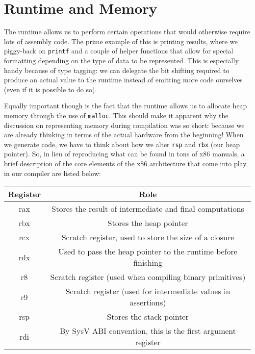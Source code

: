 \section{Runtime and Memory}
The runtime allows us to perform certain operations that would otherwise require lots of assembly code.
The prime example of this is printing results, where we piggy-back on \texttt{printf} and a couple of
helper functions that allow for special formatting depending on the type of data to be represented. This
is especially handy because of type tagging: we can delegate the bit shifting required to produce an
actual value to the runtime instead of emitting more code ourselves (even if it is possible to do so).

Equally important though is the fact that  the runtime allows us to allocate heap memory through the use of
\texttt{malloc}.
This should make it apparent why the discussion on representing memory during compilation was
so short: because we are already thinking in terms of the actual hardware from the beginning! When we generate
code, we have to think about how we alter \texttt{rsp} and \texttt{rbx} (our heap pointer).
So, in lieu of reproducing what can be found in tons of x86 manuals, a brief description of the core
elements of the x86 architecture that come into play in our compiler are listed below:

\begin{center}
  \begin{tabular}[h]{c | c}
    \toprule
    \textbf{Register} & \textbf{Role}\\
    \midrule
    rax & Stores the result of intermediate and final computations \\
    rbx & Stores the heap pointer\\
    rcx & Scratch register, used to store the size of a closure\\
    rdx & Used to pass the heap pointer to the runtime before finishing\\
    r8  & Scratch register (used when compiling binary primitives)\\
    r9  & Scratch register (used for intermediate values in assertions)\\
    rsp & Stores the stack pointer \\
    rdi & By SysV ABI convention, this is the first argument register \\
    \bottomrule
  \end{tabular}
\end{center}

